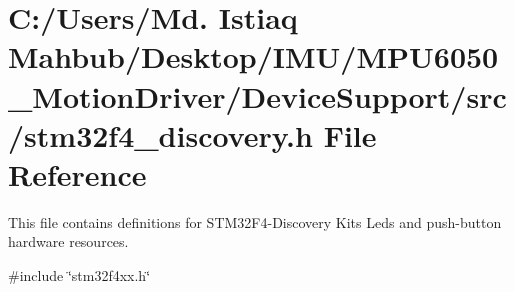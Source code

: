\section{C\+:/\+Users/\+Md. Istiaq Mahbub/\+Desktop/\+I\+M\+U/\+M\+P\+U6050\+\_\+\+Motion\+Driver/\+Device\+Support/src/stm32f4\+\_\+discovery.h File Reference}
\label{stm32f4__discovery_8h}


This file contains definitions for S\+T\+M32\+F4-\/\+Discovery Kit\textquotesingle{}s Leds and push-\/button hardware resources.  


{\ttfamily \#include \char`\"{}stm32f4xx.\+h\char`\"{}}\newline
